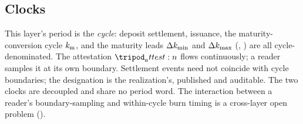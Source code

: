 \documentclass[../main.tex]{subfiles}
\begin{document}
\subsection{Clocks}
\label{sec:interface:clocks}

\begin{remark}
    \label{rem:interface:clocks}
    This layer's period is the \emph{cycle}: deposit settlement, issuance, the
    maturity-conversion cycle $k\sb{\mathrm{m}}$, and the maturity leads $\Delta k\sb{\min}$ and
    $\Delta k\sb{\max}$ (,
    ) are all cycle-denominated. The attestation $\attest{}$
    flows continuously; a reader samples it at its own boundary. Settlement events need
    not coincide with cycle boundaries; the designation is the realization's, published
    and auditable. The two clocks are
    decoupled and share no period word. The interaction between a reader's
    boundary-sampling and within-cycle burn timing is a cross-layer open problem
    ().
\end{remark}

\end{document}
